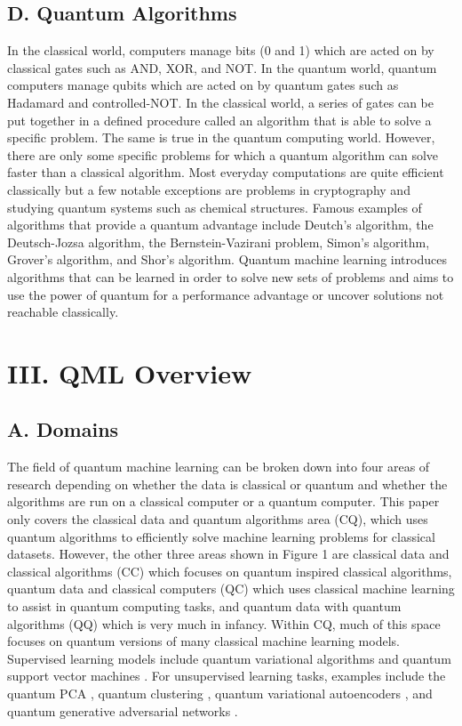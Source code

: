 \documentclass[
	a4paper, %
	10pt, %
	unnumberedsections, %
	twoside, %
]{LTJournalArticle}
\begin{document}
\subsection{D. Quantum Algorithms}
In the classical world, computers manage bits (0 and 1) which are acted on by classical gates such as AND, XOR, and NOT. In the quantum world, quantum computers manage qubits which are 
acted on by quantum gates such as Hadamard and controlled-NOT. In the classical world, a series of gates can be put together in a defined procedure called an algorithm that is able to 
solve a specific problem. The same is true in the quantum computing world. However, there are only some specific problems for which a quantum algorithm can solve faster than a classical 
algorithm. Most everyday computations are quite efficient classically but a few notable exceptions are problems in cryptography and studying quantum systems such as chemical structures. 
Famous examples of algorithms that provide a quantum advantage include Deutch's algorithm, the Deutsch-Jozsa algorithm, the Bernstein-Vazirani problem, Simon's algorithm, Grover's 
algorithm, and Shor's algorithm. Quantum machine learning introduces algorithms that can be learned in order to solve new sets of problems and aims to use the power of quantum for a 
performance advantage or uncover solutions not reachable classically.

\section{III. QML Overview}
\subsection{A. Domains}
The field of quantum machine learning can be broken down into four areas of research depending on whether the data is classical or quantum and whether the algorithms are run on a classical 
computer or a quantum computer. This paper only covers the classical data and quantum algorithms area (CQ), which uses quantum algorithms to efficiently solve machine learning problems for 
classical datasets. However, the other three areas shown in Figure 1 are classical data and classical algorithms (CC) which focuses on quantum inspired classical algorithms, 
quantum data and classical computers (QC) which uses classical machine learning to assist in quantum computing tasks, and quantum data with quantum algorithms (QQ) which is very much in infancy.
Within CQ, much of this space focuses on quantum versions of many classical machine learning models. Supervised learning models include quantum variational algorithms \autocite{peruzzo2013variational} 
and quantum support vector machines \autocite{havlivcek2019supervised}. For unsupervised learning tasks, examples include the quantum PCA \autocite{lloyd2014quantum}, quantum clustering \autocite{aimeur2007quantum},
quantum variational autoencoders \autocite{khoshaman2018quantum}, and quantum generative adversarial networks \autocite{dallaire2018quantum}.
\end{document}
